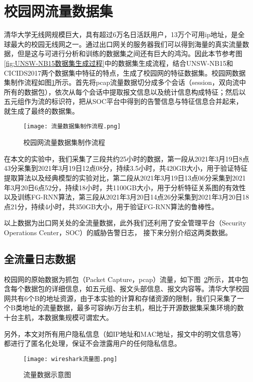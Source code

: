 \section{校园网流量数据集}
清华大学无线网规模巨大，具有超过6万名日活跃用户，13万个可用ip地址，是全球最大的校园无线网之一。通过出口网关的服务器我们可以得到海量的真实流量数据，但是这与可进行分析和训练的数据集之间还有巨大的鸿沟。因此本节参考图\ref{fig:UNSW-NB15数据集生成过程}中的数据集生成流程，结合UNSW-NB15和CICIDS2017两个数据集中特征的特点，生成了校园网的特征数据集。校园网数据集制作流程如图\ref{fig:流量数据集制作流程}所示。首先将pcap流量数据切分成多个会话（session，双向流中所有的数据包），依次从每个会话中提取报文信息以及统计信息构成特征；然后以五元组作为流的标识符，把从SOC平台中得到的告警信息与特征信息合并起来，就生成了最终的数据集。
\begin{figure}
    \centering
    \texttt{[image: 流量数据集制作流程.png]}
    \caption{校园网流量数据集制作流程}
    \label{fig:流量数据集制作流程}
  \end{figure}

在本文的实验中，我们采集了三段共约25小时的数据，第一段从2021年3月19日8点43分采集到2021年3月19日12点08分，持续3.5小时，共420GB大小，用于验证特征提取算法以及经典模型的实验对比，第二段从2021年3月19日13点06分采集到2021年3月20日6点52分，持续18小时，共1100GB大小，用于分析特征关系图的有效性以及训练FG-RNN算法，第三段从2021年3月20日14点26分采集到2021年3月20日18点21分，持续4小时，共350GB大小，用于验证FG-RNN算法的鲁棒性。

以上数据为出口网关处的全流量数据，此外我们还利用了安全管理平台（Security Operations Center，SOC）的威胁告警日志，
接下来分别介绍这两类数据。

\subsection{全流量日志数据}
校园网的原始数据为抓包（Packet Capture，pcap）流量，如下图~\ref{fig:wireshark}所示，其中包含每个数据包的详细信息，如五元组、报文头部信息、报文内容等。清华大学校园网共有6个B的地址资源，由于本实验的计算和存储资源的限制，我们只采集了一个B类地址的流量数据，最多可容纳6万台主机，相比于开源数据集采集环境的数十台主机，本数据集规模可谓宏大。

另外，本文对所有用户隐私信息（如IP地址和MAC地址，报文中的明文信息等）都进行了匿名化处理，保证不会泄露用户的任何隐私信息。

\begin{figure}
    \centering
    \texttt{[image: wireshark流量图.png]}
    \caption{流量数据示意图}
    \label{fig:wireshark}
  \end{figure}

